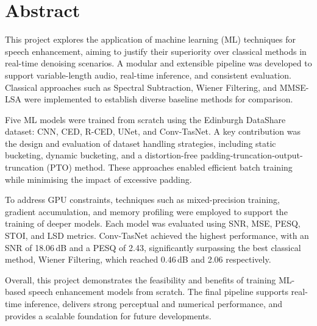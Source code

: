 \chapter*{Abstract}

This project explores the application of machine learning (ML) techniques for speech enhancement, aiming to justify their superiority over classical methods in real-time denoising scenarios. A modular and extensible pipeline was developed to support variable-length audio, real-time inference, and consistent evaluation. Classical approaches such as Spectral Subtraction, Wiener Filtering, and MMSE-LSA were implemented to establish diverse baseline methods for comparison.

Five ML models were trained from scratch using the Edinburgh DataShare dataset: CNN, CED, R-CED, UNet, and Conv-TasNet. A key contribution was the design and evaluation of dataset handling strategies, including static bucketing, dynamic bucketing, and a distortion-free padding-truncation-output-truncation (PTO) method. These approaches enabled efficient batch training while minimising the impact of excessive padding.

To address GPU constraints, techniques such as mixed-precision training, gradient accumulation, and memory profiling were employed to support the training of deeper models. Each model was evaluated using SNR, MSE, PESQ, STOI, and LSD metrics. Conv-TasNet achieved the highest performance, with an SNR of 18.06 dB and a PESQ of 2.43, significantly surpassing the best classical method, Wiener Filtering, which reached 0.46 dB and 2.06 respectively.

Overall, this project demonstrates the feasibility and benefits of training ML-based speech enhancement models from scratch. The final pipeline supports real-time inference, delivers strong perceptual and numerical performance, and provides a scalable foundation for future developments.
